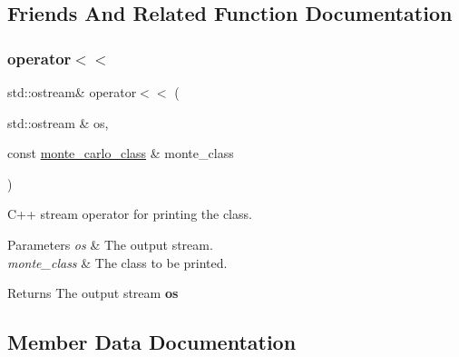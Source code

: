 \subsection{Friends And Related Function Documentation}
\mbox{\label{structMonteCarlo_1_1monte__carlo__class_a24eb0421cd0a0c30fa7b97ca39b4bf09}} 
\subsubsection{\texorpdfstring{operator$<$$<$}{operator<<}}
{\footnotesize\ttfamily std\+::ostream\& operator$<$$<$ (\begin{DoxyParamCaption}\item[{std\+::ostream \&}]{os,  }\item[{const \hyperlink{structMonteCarlo_1_1monte__carlo__class}{monte\+\_\+carlo\+\_\+class} \&}]{monte\+\_\+class }\end{DoxyParamCaption})\hspace{0.3cm}{\ttfamily [friend]}}

C++ stream operator for printing the class. 
\begin{DoxyParams}{Parameters}
{\em os} & The output stream. \\
\hline
{\em monte\+\_\+class} & The class to be printed. \\
\hline
\end{DoxyParams}
\begin{DoxyReturn}{Returns}
The output stream {\bfseries os} 
\end{DoxyReturn}


\subsection{Member Data Documentation}
\mbox{\label{structMonteCarlo_1_1monte__carlo__class_a041916db9df0075817d83e7d2298141f}} 
